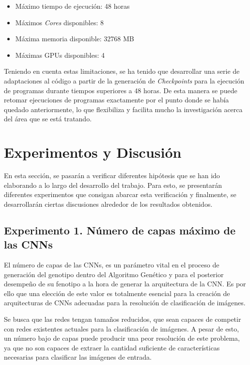 \begin{itemize}
    \item Máximo tiempo de ejecución: 48 horas
    \item Máximos \textit{Cores} disponibles: 8
    \item Máxima memoria disponible: 32768 MB
    \item Máximas GPUs disponibles: 4
\end{itemize}

Teniendo en cuenta estas limitaciones, se ha tenido que desarrollar una serie de adaptaciones al código a partir de la generación de \textit{Checkpoints} para la ejecución de programas durante tiempos superiores a 48 horas. De esta manera se puede retomar ejecuciones de programas exactamente por el punto donde se había quedado anteriormente, lo que flexibiliza y facilita mucho la investigación acerca del área que se está tratando.


\section{Experimentos y Discusión}

En esta sección, se pasarán a verificar diferentes hipótesis que se han ido elaborando a lo largo del desarrollo del trabajo. Para esto, se presentarán diferentes experimentos que consigan abarcar esta verificación y finalmente, se desarrollarán ciertas discusiones alrededor de los resultados obtenidos.

\subsection{Experimento 1. Número de capas máximo de las CNNs}

El número de capas de las CNNs, es un parámetro vital en el proceso de generación del genotipo dentro del Algoritmo Genético y para el posterior desempeño de su fenotipo a la hora de generar la arquitectura de la CNN. Es por ello que una elección de este valor es totalmente esencial para la creación de arquitecturas de CNNs adecuadas para la resolución de clasificación de imágenes.

Se busca que las redes tengan tamaños reducidos, que sean capaces de competir con redes existentes actuales para la clasificación de imágenes. A pesar de esto, un número bajo de capas puede producir una peor resolución de este problema, ya que no son capaces de extraer la cantidad suficiente de características necesarias para clasificar las imágenes de entrada.

